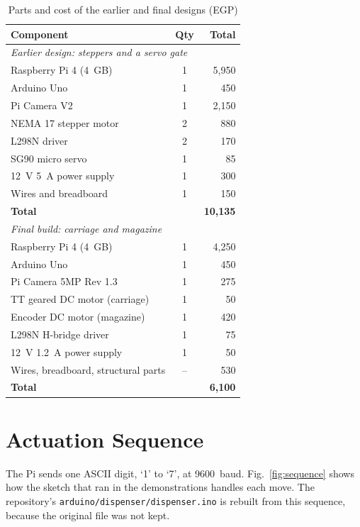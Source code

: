 \documentclass[conference]{IEEEtran}
\begin{document}
\begin{table}[t]
\caption{Parts and cost of the earlier and final designs (EGP)}
\label{tab:cost}
\centering
\small
\begin{tabular}{lcr}
\toprule
\textbf{Component} & \textbf{Qty} & \textbf{Total} \\
\midrule
\multicolumn{3}{l}{\emph{Earlier design: steppers and a servo gate}} \\
Raspberry Pi 4 (4~GB) & 1 & 5,950 \\
Arduino Uno & 1 & 450 \\
Pi Camera V2 & 1 & 2,150 \\
NEMA 17 stepper motor & 2 & 880 \\
L298N driver & 2 & 170 \\
SG90 micro servo & 1 & 85 \\
12~V 5~A power supply & 1 & 300 \\
Wires and breadboard & 1 & 150 \\
\textbf{Total} & & \textbf{10,135} \\
\midrule
\multicolumn{3}{l}{\emph{Final build: carriage and magazine}} \\
Raspberry Pi 4 (4~GB) & 1 & 4,250 \\
Arduino Uno & 1 & 450 \\
Pi Camera 5MP Rev 1.3 & 1 & 275 \\
TT geared DC motor (carriage) & 1 & 50 \\
Encoder DC motor (magazine) & 1 & 420 \\
L298N H-bridge driver & 1 & 75 \\
12~V 1.2~A power supply & 1 & 50 \\
Wires, breadboard, structural parts & -- & 530 \\
\textbf{Total} & & \textbf{6,100} \\
\bottomrule
\end{tabular}
\end{table}

\section{Actuation Sequence}
The Pi sends one ASCII digit, `1' to `7', at 9600~baud. Fig.~\ref{fig:sequence} shows how the sketch that ran in the demonstrations handles each move. The repository's \texttt{arduino/dispenser/dispenser.ino} is rebuilt from this sequence, because the original file was not kept.
\end{document}
